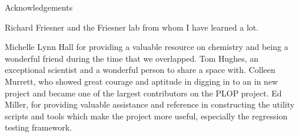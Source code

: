 {\centering
\LARGE
Acknowledgements
\par
}

Richard Friesner and the Friesner lab from whom I have learned a lot.

Michelle Lynn Hall for providing a valuable resource on chemistry and being a wonderful friend during the time that we overlapped.
Tom Hughes, an exceptional scientist and a wonderful person to share a space with.
Colleen Murrett, who showed great courage and aptitude in digging in to an in new project and became one of the largest contributors on the PLOP project.
Ed Miller, for providing valuable assistance and reference in constructing the utility scripts and tools which make the project more useful, especially the regression testing framework. 
